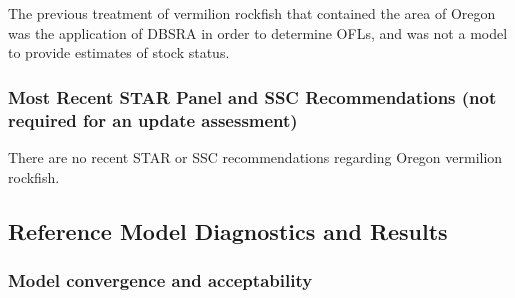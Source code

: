 \documentclass[11pt,
  english,
  a4paper,
]{article}
\begin{document}
\leavevmode\tagmcend\tagstructend


The previous treatment of vermilion rockfish that contained the area of Oregon was the application of DBSRA in order to determine OFLs, and was not a model to provide estimates of stock status.

\leavevmode\tagmcend\tagstructend\par


\hypertarget{most-recent-star-panel-and-ssc-recommendations-not-required-for-an-update-assessment}{%
\subsubsection{Most Recent STAR Panel and SSC Recommendations (not required for an update assessment)}\label{most-recent-star-panel-and-ssc-recommendations-not-required-for-an-update-assessment}}

\leavevmode\tagmcend\tagstructend


There are no recent STAR or SSC recommendations regarding Oregon vermilion rockfish.

\leavevmode\tagmcend\tagstructend\par


\hypertarget{reference-model-diagnostics-and-results}{%
\subsection{Reference Model Diagnostics and Results}\label{reference-model-diagnostics-and-results}}

\leavevmode\tagmcend\tagstructend


\hypertarget{model-convergence-and-acceptability}{%
\subsubsection{Model convergence and acceptability}\label{model-convergence-and-acceptability}}

\leavevmode\tagmcend\tagstructend

\end{document}
